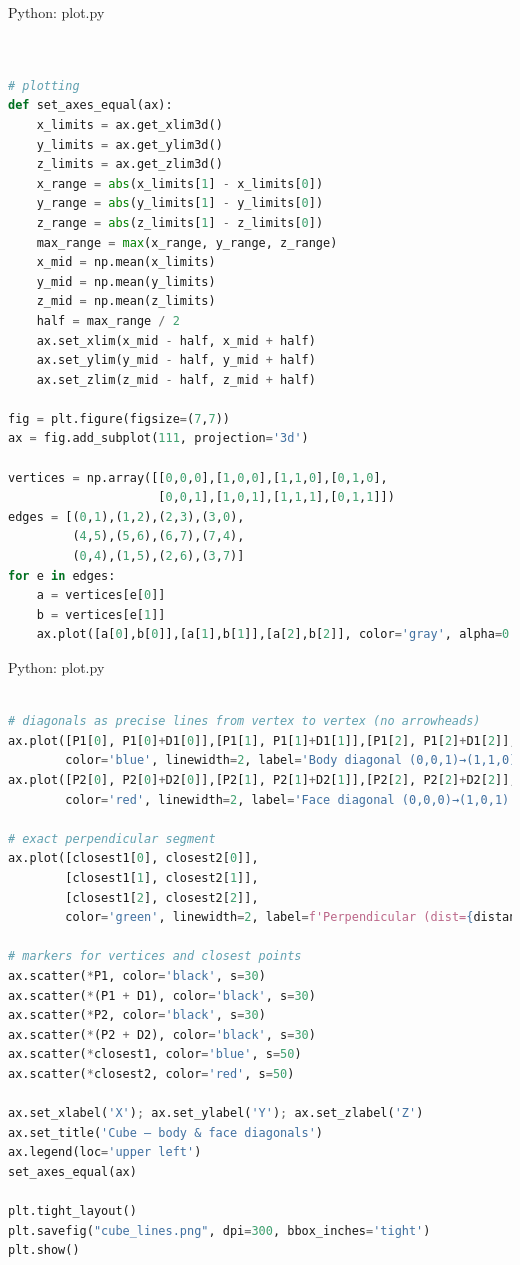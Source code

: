 \documentclass{beamer}
\numberwithin{equation}{section}
\theoremstyle{remark}
\begin{document}
\begin{frame}[fragile]{Python: plot.py}
\begin{lstlisting}[language=Python]


# plotting
def set_axes_equal(ax):
    x_limits = ax.get_xlim3d()
    y_limits = ax.get_ylim3d()
    z_limits = ax.get_zlim3d()
    x_range = abs(x_limits[1] - x_limits[0])
    y_range = abs(y_limits[1] - y_limits[0])
    z_range = abs(z_limits[1] - z_limits[0])
    max_range = max(x_range, y_range, z_range)
    x_mid = np.mean(x_limits)
    y_mid = np.mean(y_limits)
    z_mid = np.mean(z_limits)
    half = max_range / 2
    ax.set_xlim(x_mid - half, x_mid + half)
    ax.set_ylim(y_mid - half, y_mid + half)
    ax.set_zlim(z_mid - half, z_mid + half)

fig = plt.figure(figsize=(7,7))
ax = fig.add_subplot(111, projection='3d')

vertices = np.array([[0,0,0],[1,0,0],[1,1,0],[0,1,0],
                     [0,0,1],[1,0,1],[1,1,1],[0,1,1]])
edges = [(0,1),(1,2),(2,3),(3,0),
         (4,5),(5,6),(6,7),(7,4),
         (0,4),(1,5),(2,6),(3,7)]
for e in edges:
    a = vertices[e[0]]
    b = vertices[e[1]]
    ax.plot([a[0],b[0]],[a[1],b[1]],[a[2],b[2]], color='gray', alpha=0.6)

\end{lstlisting}
\end{frame}

\begin{frame}[fragile]{Python: plot.py}
\begin{lstlisting}[language=Python]

# diagonals as precise lines from vertex to vertex (no arrowheads)
ax.plot([P1[0], P1[0]+D1[0]],[P1[1], P1[1]+D1[1]],[P1[2], P1[2]+D1[2]],
        color='blue', linewidth=2, label='Body diagonal (0,0,1)→(1,1,0)')
ax.plot([P2[0], P2[0]+D2[0]],[P2[1], P2[1]+D2[1]],[P2[2], P2[2]+D2[2]],
        color='red', linewidth=2, label='Face diagonal (0,0,0)→(1,0,1)')

# exact perpendicular segment
ax.plot([closest1[0], closest2[0]],
        [closest1[1], closest2[1]],
        [closest1[2], closest2[2]],
        color='green', linewidth=2, label=f'Perpendicular (dist={distance:.4f})')

# markers for vertices and closest points
ax.scatter(*P1, color='black', s=30)
ax.scatter(*(P1 + D1), color='black', s=30)
ax.scatter(*P2, color='black', s=30)
ax.scatter(*(P2 + D2), color='black', s=30)
ax.scatter(*closest1, color='blue', s=50)
ax.scatter(*closest2, color='red', s=50)

ax.set_xlabel('X'); ax.set_ylabel('Y'); ax.set_zlabel('Z')
ax.set_title('Cube — body & face diagonals')
ax.legend(loc='upper left')
set_axes_equal(ax)

plt.tight_layout()
plt.savefig("cube_lines.png", dpi=300, bbox_inches='tight')
plt.show()



\end{lstlisting}
\end{frame}
\end{document}
